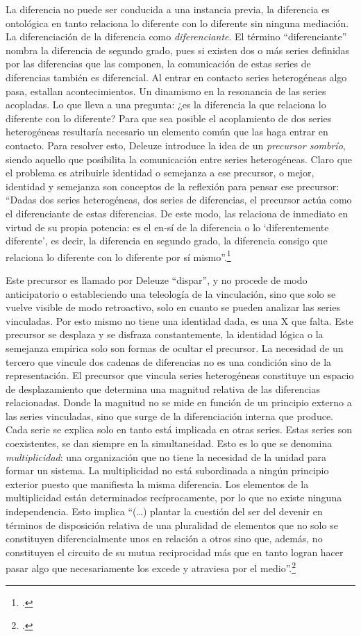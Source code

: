 La diferencia no puede ser conducida a una instancia previa, la
diferencia es ontológica en tanto relaciona lo diferente con lo
diferente sin ninguna mediación. La diferenciación de la diferencia como
\emph{diferenciante}. El término \enquote{diferenciante} nombra la diferencia de
segundo grado, pues si existen dos o más series definidas por las
diferencias que las componen, la comunicación de estas series de
diferencias también es diferencial. Al entrar en contacto series
heterogéneas algo pasa, estallan acontecimientos. Un dinamismo en la
resonancia de las series acopladas. Lo que lleva a una pregunta: ¿es la
diferencia la que relaciona lo diferente con lo diferente? Para que sea
posible el acoplamiento de dos series heterogéneas resultaría necesario
un elemento común que las haga entrar en contacto. Para resolver esto,
Deleuze introduce la idea de un \emph{precursor sombrío}, siendo aquello
que posibilita la comunicación entre series heterogéneas. Claro que el
problema es atribuirle identidad o semejanza a ese precursor, o mejor,
identidad y semejanza son conceptos de la reflexión para pensar ese
precursor: \enquote{Dadas dos series heterogéneas, dos series de diferencias, el
precursor actúa como el diferenciante de estas diferencias. De este
modo, las relaciona de inmediato en virtud de su propia potencia: es el
en-sí de la diferencia o lo \enquote{diferentemente diferente}, es decir, la
diferencia en segundo grado, la diferencia consigo que relaciona lo
diferente con lo diferente por sí mismo}.\footcite[186]{deleuze2005b}

Este precursor es llamado por Deleuze \enquote{dispar}, y no procede de modo
anticipatorio o estableciendo una teleología de la vinculación, sino que
solo se vuelve visible de modo retroactivo, solo en cuanto se pueden
analizar las series vinculadas. Por esto mismo no tiene una identidad
dada, es una X que falta. Este precursor se desplaza y se disfraza
constantemente, la identidad lógica o la semejanza empírica solo son
formas de ocultar el precursor. La necesidad de un tercero que vincule
dos cadenas de diferencias no es una condición sino de la
representación. El precursor que vincula series heterogéneas constituye
un espacio de desplazamiento que determina una magnitud relativa de las
diferencias relacionadas. Donde la magnitud no se mide en función de un
principio externo a las series vinculadas, sino que surge de la
diferenciación interna que produce. Cada serie se explica solo en tanto
está implicada en otras series. Estas series son coexistentes, se dan
siempre en la simultaneidad. Esto es lo que se denomina
\emph{multiplicidad}: una organización que no tiene la necesidad de la
unidad para formar un sistema. La multiplicidad no está subordinada a
ningún principio exterior puesto que manifiesta la misma diferencia. Los
elementos de la multiplicidad están determinados recíprocamente, por lo
que no existe ninguna independencia. Esto implica \enquote{(\dots) plantar
la cuestión del ser del devenir en términos de disposición relativa de
una pluralidad de elementos que no solo se constituyen diferencialmente
unos en relación a otros sino que, además, no constituyen el circuito de
su mutua reciprocidad más que en tanto logran hacer pasar algo que
necesariamente los excede y atraviesa por el medio}.\footcite[15]{gallego2008}

